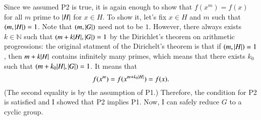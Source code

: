 \documentclass[a4paper, 12pt]{article}
\theoremstyle{Mydefinition}
\theoremstyle{Mytheorem}
\begin{document}
Since we assumed P2 is true, it is again enough to show that $f(x^m)=f(x)$ for all $m$ prime to $\abs{H}$ for $x\in H$. To show it, let's fix $x\in H$ and $m$ such that $(m,\abs{H})=1$. Note that $(m,\abs{G})$ need not to be $1$. However, there always exists $k\in\mathbb{N}$ such that $(m+k\abs{H}, \abs{G})=1$ by the Dirichlet's theorem on arithmetic progressions: the original statment of the Dirichelt's theorem is that if $(m,\abs{H})=1$, then $m+k\abs{H}$ contains infinitely many primes, which means that there exists $k_0$ such that $(m+k_0\abs{H},\abs{G})=1$. It means that
\begin{equation}
    f(x^{m}) = f(x^{m+k_0\abs{H}}) = f(x).
\end{equation}
(The second equality is by the assumption of P1.) Therefore, the condition for P2 is satisfied and I showed that P2 implies P1. Now, I can safely reduce $G$ to a cyclic group.
\end{document}
